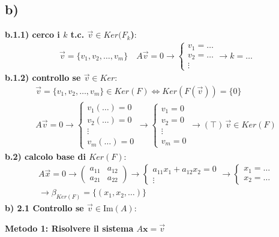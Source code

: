 \documentclass[a4paper,12pt]{article}
\begin{document}
\subsection*{b)}
\textbf{b.1.1) cerco i $k$ t.c. $\vec{v} \in Ker(F_k$)}: 
\begin{align*}
    \vec{v}=\{v_1,v_2,\dots,v_m\} \quad 
    A\vec{v}=0 \to \begin{cases}
        v_1=\dots \\
        v_2=\dots \\
        \vdots
    \end{cases}
    \to \boxed{k=\dots}
\end{align*}
\textbf{b.1.2) controllo se $\vec{v}\in Ker$}: 
\begin{align*}
    \vec{v}=\{v_1,v_2,\dots,v_m\}\in Ker(F)\iff Ker(F(\vec{v}))=\{0\}\\
    A\vec{v}=0 \to 
    \begin{cases}
        v_1(\dots)=0\\
        v_2(\dots)=0\\
        \vdots \\
        v_m(\dots)=0
    \end{cases}
    \to \begin{cases}
        v_1=0\\
        v_2=0\\
        \vdots \\
        v_m=0
    \end{cases} \to  (\top)\, \vec{v}\in Ker(F)
\end{align*}
\textbf{b.2) calcolo base di $Ker(F)$}:
\begin{align*}
    A\vec{x}=0 \to \begin{pmatrix}
        a_{11} & a_{12}\\
        a_{21} & a_{22}
    \end{pmatrix} 
    \to \begin{cases}
        a_{11}x_1 + a_{12}x_2 =0 \\
        \vdots
    \end{cases} \to \begin{cases}
        x_1=\dots \\
        x_2=\dots
    \end{cases} \\
    \to \beta_{Ker(F)}=\{(x_1,x_2,\dots)\}
\end{align*}
\textbf{b) 2.1 Controllo se \( \vec{v} \in \text{Im}(A) \)}:

\textbf{Metodo 1: Risolvere il sistema \( A \mathbf{x} = \vec{v} \)}
\end{document}
